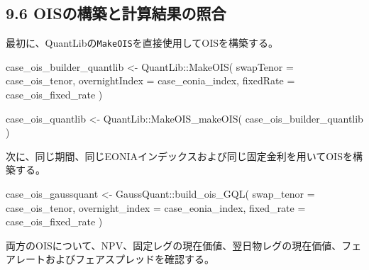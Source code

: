 \documentclass[
  letterpaper,
  DIV=11,
  numbers=noendperiod]{scrreprt}
\newenvironment{Shaded}{\begin{snugshade}}{\end{snugshade}}
\newcommand{\AttributeTok}[1]{\textcolor[rgb]{0.40,0.45,0.13}{#1}}
\newcommand{\FunctionTok}[1]{\textcolor[rgb]{0.28,0.35,0.67}{#1}}
\newcommand{\NormalTok}[1]{\textcolor[rgb]{0.00,0.23,0.31}{#1}}
\newcommand{\OtherTok}[1]{\textcolor[rgb]{0.00,0.23,0.31}{#1}}
\newcommand{\SpecialCharTok}[1]{\textcolor[rgb]{0.37,0.37,0.37}{#1}}
\begin{document}
\subsection{9.6
OISの構築と計算結果の照合}\label{oisux306eux69cbux7bc9ux3068ux8a08ux7b97ux7d50ux679cux306eux7167ux5408}

最初に、QuantLibの\texttt{MakeOIS}を直接使用してOISを構築する。

\begin{Shaded}
\begin{Highlighting}[]
\NormalTok{case\_ois\_builder\_quantlib }\OtherTok{\textless{}{-}}\NormalTok{ QuantLib}\SpecialCharTok{::}\FunctionTok{MakeOIS}\NormalTok{(}
  \AttributeTok{swapTenor =}\NormalTok{ case\_ois\_tenor,}
  \AttributeTok{overnightIndex =}\NormalTok{ case\_eonia\_index,}
  \AttributeTok{fixedRate =}\NormalTok{ case\_ois\_fixed\_rate}
\NormalTok{)}

\NormalTok{case\_ois\_quantlib }\OtherTok{\textless{}{-}}\NormalTok{ QuantLib}\SpecialCharTok{::}\FunctionTok{MakeOIS\_makeOIS}\NormalTok{(}
\NormalTok{  case\_ois\_builder\_quantlib}
\NormalTok{)}
\end{Highlighting}
\end{Shaded}

次に、同じ期間、同じEONIAインデックスおよび同じ固定金利を用いてOISを構築する。

\begin{Shaded}
\begin{Highlighting}[]
\NormalTok{case\_ois\_gaussquant }\OtherTok{\textless{}{-}}\NormalTok{ GaussQuant}\SpecialCharTok{::}\FunctionTok{build\_ois\_GQL}\NormalTok{(}
  \AttributeTok{swap\_tenor =}\NormalTok{ case\_ois\_tenor,}
  \AttributeTok{overnight\_index =}\NormalTok{ case\_eonia\_index,}
  \AttributeTok{fixed\_rate =}\NormalTok{ case\_ois\_fixed\_rate}
\NormalTok{)}
\end{Highlighting}
\end{Shaded}

両方のOISについて、NPV、固定レグの現在価値、翌日物レグの現在価値、フェアレートおよびフェアスプレッドを確認する。
\end{document}
